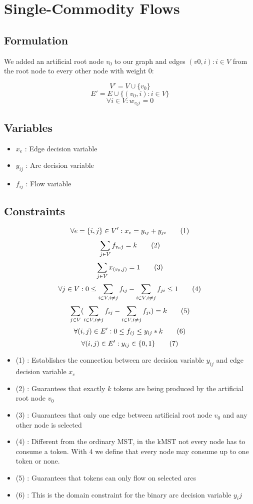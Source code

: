 \section{Single-Commodity Flows}

\subsection{Formulation}

We added an artificial root node $v_0$ to our graph and edges $(v0,i) : i \in V$  from the root node to every other node with weight $0$:

\[V' = V \cup \{v_0\}\]
\[E' = E \cup \{(v_0,i) : i \in V\}\]
\[\forall i \in V : w_{v_0i} = 0 \]

\subsection{Variables}

\begin{itemize}
	\item $x_{e}$ : Edge decision variable
	\item $y_{ij}$ : Arc decision variable
	\item $f_{ij}$ : Flow variable
\end{itemize}

\subsection{Constraints}
\[\forall e = \{i,j\} \in V' : x_e = y_{ij} + y_{ji} \addtag \]
\[\sum_{j \in V}f_{v_0j} = k \addtag \]
\[\sum_{j \in V}x_{(v_0,j)} = 1 \addtag \]
\[\forall j \in V : 0 \leq \sum_{i \in V,i \neq j}f_{ij} - \sum_{i \in V,i \neq j}f_{ji} \leq 1 \addtag \]
\[\sum_{j \in V}(\sum_{i \in V,i \neq j}f_{ij} - \sum_{i \in V,i \neq j}f_{ji}) = k \addtag \]
\[\forall (i,j) \in E' : 0 \leq f_{ij} \leq y_{ij}*k \addtag \]
\[\forall (i,j) \in E' : y_{ij} \in \{0,1\} \addtag \]

\begin{itemize}
	\item (1) : Establishes the connection between arc decision variable $y_{ij}$ and edge decision variable $x_e$
	\item (2) : Guarantees that exactly $k$ tokens are being produced by the artificial root node $v_0$ 
	\item (3) : Guarantees that only one edge between artificial root node $v_0$ and any other node is selected
	\item (4) : Different from the ordinary MST, in the kMST not every node has to consume a token. With 4 we define that every node may consume up to one token or none.
	\item (5) : Guarantees that tokens can only flow on selected arcs
	\item (6) : This is the domain constraint for the binary arc decision variable $y_ij$
\end{itemize}


